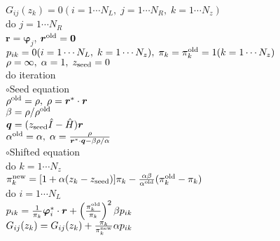 \documentclass[12pt,titlepage]{article}
\begin{document}
\noindent
$G_{i j}(z_k) = 0 (i=1 \cdots N_L,\; j = 1 \cdots N_R,\; k=1 \cdots N_z)$
\\
do $j = 1 \cdots N_R$
\\\hspace{0.5cm}
${\boldsymbol r} = {\boldsymbol \varphi_j}$, 
${\boldsymbol r}^{\rm old} = {\bf 0}$
\\\hspace{0.5cm}
$p_{i k} = 0(i=1 \cdots N_L,\; k=1 \cdots N_z),\; \pi_k=\pi_k^{\rm old} = 1(k=1 \cdots N_z)$ 
\\\hspace{0.5cm}
$\rho = \infty,\; \alpha = 1,\; z_{\rm seed}=0$ 
\\\hspace{0.5cm}
do iteration
\\\hspace{1.0cm}
$\circ$Seed equation
\\\hspace{1.0cm}
$\rho^{\rm old} = \rho,\; \rho = {\boldsymbol r}^* \cdot {\boldsymbol r}$
\\\hspace{1.0cm}
$\beta = \rho / \rho^{\rm old}$
\\\hspace{1.0cm}
${\boldsymbol q} = (z_{\rm seed} {\hat I} - {\hat H}){\boldsymbol r}$
\\\hspace{1.0cm}
$\alpha^{\rm old} = \alpha,\; 
\alpha = \frac{\rho}{{\boldsymbol r}^* \cdot {\boldsymbol q} - \beta \rho / \alpha }$
\\\hspace{1.0cm}
$\circ$Shifted equation
\\\hspace{1.0cm}
do $k = 1 \cdots N_z$
\\\hspace{1.5cm}
$\pi_k^{\rm new} = [1+\alpha(z_k-z_{\rm seed})]\pi_k - \frac{\alpha \beta}{\alpha^{\rm old}}(\pi_k^{\rm old} - \pi_k)$
\\\hspace{1.5cm}
do $i = 1 \cdots N_L$
\\\hspace{2.0cm}
$p_{i k} = \frac{1}{\pi_k} {\boldsymbol \varphi}_i^* \cdot {\boldsymbol r} + 
\left(\frac{\pi^{\rm old}_k}{\pi_k } \right)^2 \beta p_{i k}$
\\\hspace{2.0cm}
$G_{i j}(z_k) = G_{i j}(z_k) + \frac{\pi_k}{\pi_k^{\rm new}} \alpha p_{i k}$
\\\hspace{2.0cm}
\end{document}
